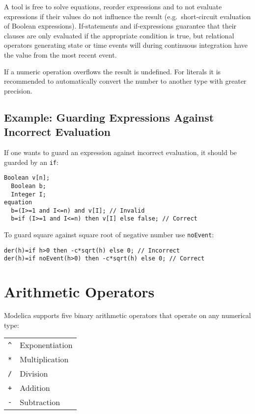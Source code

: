 A tool is free to solve equations, reorder expressions and to not evaluate expressions if their values do not influence the result (e.g.\ short-circuit
evaluation of Boolean expressions).  If-statements and if-expressions guarantee that their clauses are only evaluated if the appropriate condition is true,
but relational operators generating state or time events will during continuous integration have the value from the most recent event.

If a numeric operation overflows the result is undefined. For literals
it is recommended to automatically convert the number to another type
with greater precision.

\subsection{Example: Guarding Expressions Against Incorrect Evaluation}\label{example-guarding-expressions-against-incorrect-evaluation}

\begin{example}
If one wants to guard an expression against incorrect evaluation, it should be guarded by an \lstinline!if!:
\begin{lstlisting}[language=modelica]
  Boolean v[n];
  Boolean b;
  Integer I;
equation
  b=(I>=1 and I<=n) and v[I]; // Invalid
  b=if (I>=1 and I<=n) then v[I] else false; // Correct
\end{lstlisting}

To guard square against square root of negative number use \lstinline!noEvent!:
\begin{lstlisting}[language=modelica]
der(h)=if h>0 then -c*sqrt(h) else 0; // Incorrect
der(h)=if noEvent(h>0) then -c*sqrt(h) else 0; // Correct
\end{lstlisting}
\end{example}

\section{Arithmetic Operators}\label{arithmetic-operators}

Modelica supports five binary arithmetic operators that operate on any
numerical type:
\begin{longtable}[c]{ll}
\lstinline!^! & Exponentiation\\
\lstinline!*! & Multiplication\\
\lstinline!/! & Division\\
\lstinline!+! & Addition\\
\lstinline!-! & Subtraction\\
\end{longtable}

